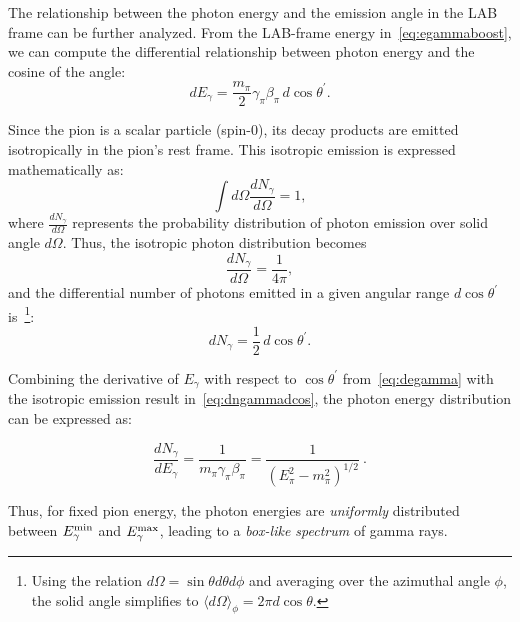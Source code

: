 
The relationship between the photon energy and the emission angle in the LAB frame can be further analyzed. From the LAB-frame energy in~\cref{eq:egammaboost}, we can compute the differential relationship between photon energy and the cosine of the angle:
\begin{equation}\label{eq:degamma}
dE_\gamma = \frac{m_\pi}{2} \gamma_\pi \beta_\pi \, d\!\cos \theta^\prime.
\end{equation}

Since the pion is a scalar particle (spin-0), its decay products are emitted isotropically in the pion’s rest frame. This isotropic emission is expressed mathematically as:
\begin{equation}
\int d\Omega \frac{dN_\gamma}{d\Omega} = 1,
\end{equation}
where \(\frac{dN_\gamma}{d\Omega}\) represents the probability distribution of photon emission over solid angle \(d\Omega\).  
%
Thus, the isotropic photon distribution becomes
\begin{equation}
\frac{dN_\gamma}{d\Omega} = \frac{1}{4\pi},
\end{equation}
%
and the differential number of photons emitted in a given angular range \(d\cos\theta^\prime\) is~\footnote{Using the relation \(d\Omega = \sin \theta d\theta d\phi\) and averaging over the azimuthal angle \(\phi\), the solid angle simplifies to \(\langle d\Omega \rangle_\phi = 2\pi d\cos\theta\).}:
\begin{equation}\label{eq:dngammadcos}
dN_\gamma = \frac{1}{2} \, d\cos\theta^\prime.
\end{equation}

Combining the derivative of \(E_\gamma\) with respect to \(\cos \theta^\prime\) from~\cref{eq:degamma} with the isotropic emission result in~\cref{eq:dngammadcos}, the photon energy distribution can be expressed as:
%
\begin{remark}
\begin{equation}
\frac{dN_\gamma}{dE_\gamma} = \frac{1}{m_\pi \gamma_\pi \beta_\pi} = \frac{1}{(E_\pi^2 - m_\pi^2)^{1/2}}~.
\end{equation}
\end{remark}
%
Thus, for fixed pion energy, the photon energies are \emph{uniformly} distributed between \(E_\gamma^{\rm min}\) and \(E_\gamma^{\rm max}\), leading to a \emph{box-like spectrum} of gamma rays.  

